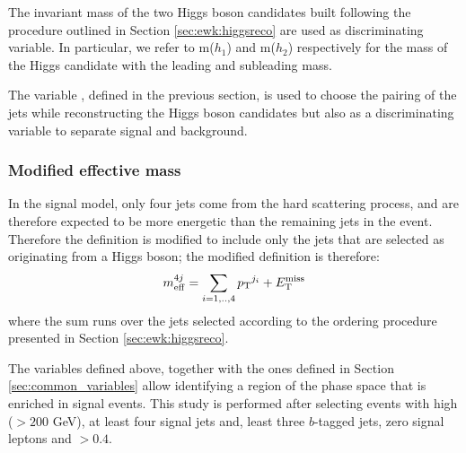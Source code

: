 The invariant mass of the two Higgs boson candidates built following the procedure outlined in Section \ref{sec:ewk:higgsreco} 
are used as discriminating variable. In particular, we refer to m($h_1$) and m($h_2$) respectively for the mass of the Higgs candidate with 
the leading and subleading mass.

The variable \dRmax, defined in the previous section, is used to choose the pairing of the jets while reconstructing 
the Higgs boson candidates but also as a discriminating variable to separate signal and background. 

\subsubsection*{Modified effective mass}

In the signal model, only four jets come from the hard scattering process, and are therefore expected to be more energetic than the 
remaining jets in the event. Therefore the \meff definition is modified to include only the jets that are selected 
as originating from a Higgs boson; the modified definition is therefore:
\begin{equation}
m_{\mathrm{eff}}^{4j} = \sum_{i=1,..,4} {p_{\rm T}}^{j_i} + E_{\rm T}^{\mathrm{miss}}
\end{equation}
\noindent where the sum runs over the jets selected according to the ordering procedure presented in Section \ref{sec:ewk:higgsreco}. 


The variables defined above, together with the ones defined in Section \ref{sec:common_variables} 
allow identifying a region of the phase space that is enriched in signal events. 
This study is performed after selecting events with high \met ($> 200$ GeV), at least four signal jets and, least three $b$-tagged jets, zero signal leptons and \dphimin $>0.4$.

